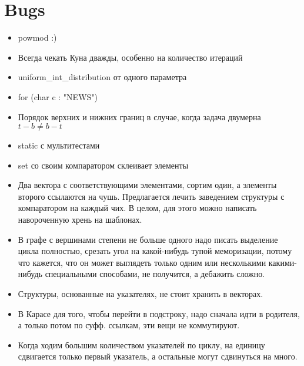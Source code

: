 \section{Bugs}

\begin{itemize}
    \item powmod :)

    \item Всегда чекать Куна дважды, особенно на количество итераций
    
    \item uniform\_int\_distribution от одного параметра
    
    \item for (char c : "NEWS")
    
    \item Порядок верхних и нижних границ в случае, когда задача двумерна
    $t - b \neq b - t$
    
    \item static с мультитестами

    \item set со своим компаратором склеивает элементы

    \item Два вектора с соответствующими элементами, сортим один, а элементы
    второго ссылаются на чушь. Предлагается лечить заведением структуры с
    компаратором на каждый чих. В целом, для этого можно написать навороченную
    хрень на шаблонах.

    \item В графе с вершинами степени не больше одного надо писать выделение
    цикла полностью, срезать угол на какой-нибудь тупой меморизации, потому
    что кажется, что он может выглядеть только одним или несколькими
    какими-нибудь специальными способами, не получится, а дебажить сложно.

    \item Структуры, основанные на указателях, не стоит хранить в векторах.

    \item В Карасе для того, чтобы перейти в подстроку, надо сначала идти в
    родителя, а только потом по суфф. ссылкам, эти вещи не коммутируют.

    \item Когда ходим большим количеством указателей по циклу, на единицу
    сдвигается только первый указатель, а остальные могут сдвинуться на много.
\end{itemize}
